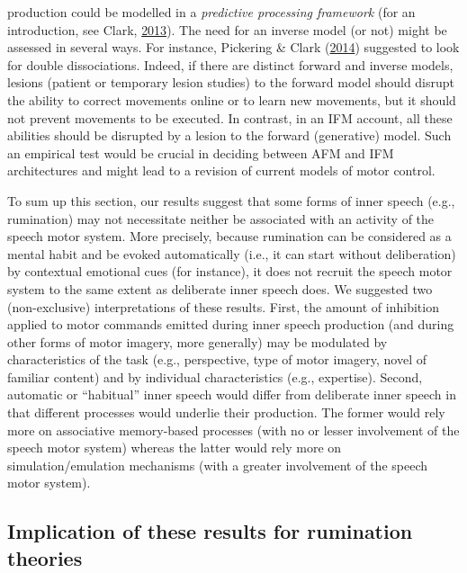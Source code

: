 \documentclass[a4paper,12pt,twoside,openright,oldfontcommands,final]{memoir}
\begin{document}
production could be modelled in a \emph{predictive processing framework} (for an introduction, see Clark, \protect\hyperlink{ref-clark_whatever_2013}{2013}). The need for an inverse model (or not) might be assessed in several ways. For instance, Pickering \& Clark (\protect\hyperlink{ref-pickering_getting_2014}{2014}) suggested to look for double dissociations. Indeed, if there are distinct forward and inverse models, lesions (patient or temporary lesion studies) to the forward model should disrupt the ability to correct movements online or to learn new movements, but it should not prevent movements to be executed. In contrast, in an IFM account, all these abilities should be disrupted by a lesion to the forward (generative) model. Such an empirical test would be crucial in deciding between AFM and IFM architectures and might lead to a revision of current models of motor control.

To sum up this section, our results suggest that some forms of inner speech (e.g., rumination) may not necessitate neither be associated with an activity of the speech motor system. More precisely, because rumination can be considered as a mental habit and be evoked automatically (i.e., it can start without deliberation) by contextual emotional cues (for instance), it does not recruit the speech motor system to the same extent as deliberate inner speech does. We suggested two (non-exclusive) interpretations of these results. First, the amount of inhibition applied to motor commands emitted during inner speech production (and during other forms of motor imagery, more generally) may be modulated by characteristics of the task (e.g., perspective, type of motor imagery, novel of familiar content) and by individual characteristics (e.g., expertise). Second, automatic or \enquote{habitual} inner speech would differ from deliberate inner speech in that different processes would underlie their production. The former would rely more on associative memory-based processes (with no or lesser involvement of the speech motor system) whereas the latter would rely more on simulation/emulation mechanisms (with a greater involvement of the speech motor system).

\hypertarget{implication-of-these-results-for-rumination-theories}{%
\subsection{Implication of these results for rumination theories}\label{implication-of-these-results-for-rumination-theories}}
\end{document}

